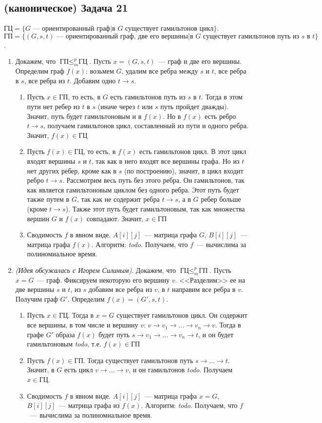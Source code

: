 \documentclass[a4paper]{article}
\def\GC{{\mbox{ГЦ}}}
\def\GP{{\mbox{ГП}}}
\begin{document}
\subsection*{(каноническое) Задача 21}
$\GC=\{G\mbox{~--- ориентированный граф}\big|\mbox{в }G\mbox{ существует гамильтонов цикл}\}$.\newline
$\GP=\{(G,s,t)\mbox{~--- ориентированный граф, две его вершины}\big|\mbox{в }G\mbox{ существует гамильтонов путь из }s\mbox{ в }t\}$.\begin{enumerate}
\item Докажем, что $\GP\leqslant_m^p\GC$. Пусть $x=(G,s,t)$~--- граф и две его вершины. Определим граф $f(x)$: возьмем $G$, удалим все ребра между $s$ и $t$, все ребра в $s$, все ребра из $t$. Добавим одно $t\to s$.\begin{enumerate}
\item Пусть $x\in\GP$, то есть, в $G$ есть гамильтонов путь из $s$ в $t$. Тогда в этом пути нет ребер из $t$ в $s$ (иначе через $t$ или $s$ путь пройдет дважды). Значит, путь будет гамильтоновым и в $f(x)$. Но в $f(x)$ есть ребро $t\to s$, получаем гамильтонов цикл, составленный из пути и одного ребра. Значит, $f(x)\in\GC$
\item Пусть $f(x)\in\GC$, то есть, в $f(x)$ есть гамильтонов цикл. В этот цикл входят вершины $s$ и $t$, так как в него входят все вершины графа. Но из $t$ нет других ребер, кроме как в $s$ (по построению), значит, в цикл входит ребро $t\to s$. Рассмотрим весь путь без этого ребра. Он гамильтонов, так как является гамильтоновым циклом без одного ребра. Этот путь будет также путем в $G$, так как не содержит ребра $t\to s$, а в $G$ ребер больше (кроме $t\to s$). Также этот путь будет гамильтоновым, так как множества вершин $G$ и $f(x)$ совпадают. Значит, $x\in\GP$
\item Сводимость $f$ в явном виде. $A[i][j]$~--- матрица графа $G$, $B[i][j]$~--- матрица графа $f(x)$. Алгоритм: {\em todo}. Получаем, что $f$~--- вычислима за полиномиальное время.
\end{enumerate}
\item {\em (Идея обсужалась с Игорем Силиным)}. Докажем, что $\GC\leqslant_m^p\GP$. Пусть $x=G$~--- граф. Фиксируем некоторую его вершину $v$. <<Разделим>> ее на две вершины $s$ и $t$, из $s$ добавим все ребра из $v$, в $t$ направим все ребра в $v$. Получим граф $G'$. Определим $f(x)=(G',s,t)$.\begin{enumerate}
\item Пусть $x\in\GC$. Тогда в $x=G$ существует гамильтонов цикл. Он содержит все вершины, в том числе и вершину $v$: $v\to v_1\to...\to v_n\to v$. Тогда в графе $G'$ образа $f(x)$ будет путь $s\to v_1\to...\to v_n\to t$, и он будет гамильтоновым {\em todo}, т.е. $f(x)\in\GP$
\item Пусть $f(x)\in\GP$. Тогда существует гамильтонов путь $s\to...\to t$. Значит, в $G$ есть цикл $v\to...\to v$, и он гамильтонов {\em todo}. Получаем $x\in\GC$.
\item Сводимость $f$ в явном виде. $A[i][j]$~--- матрица графа $x=G$, $B[i][j]$~--- матрица графа из $f(x)$. Алгоритм: {\em todo}. Получаем, что $f$~--- вычислима за полиномиальное время.
\end{enumerate}
\end{enumerate}
\end{document}
